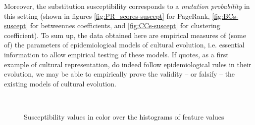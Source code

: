 Moreover, the substitution susceptibility corresponds to a \emph{mutation probability} in this setting (shown in figures \ref{fig:PR_scores-suscept} for PageRank, \ref{fig:BCs-suscept} for betweennes coefficients, and \ref{fig:CCs-suscept} for clustering coefficient). To sum up, the data obtained here are empirical measures of (some of) the parameters of epidemiological models of cultural evolution, i.e. essential information to allow empirical testing of these models. If quotes, as a first example of cultural representation, do indeed follow epidemiological rules in their evolution, we may be able to empirically prove the validity -- or falsify -- the existing models of cultural evolution.



\begin{figure*}[!th]
	\centering
	~
	~
	\caption{Susceptibility values in color over the histograms of feature values}
\end{figure*}

